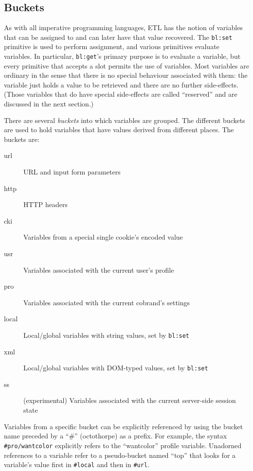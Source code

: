 \documentclass{www2003-submission}
\newcommand{\smtexttt}[1]{{\small\texttt{#1}}}
\begin{document}
\subsection{Buckets}
\label{ssec-buckets}

As with all imperative programming languages, ETL has the notion of
variables that can be assigned to and can later have that value
recovered.  The \smtexttt{bl:set} primitive is used to perform
assignment, and various primitives evaluate variables. In particular,
\smtexttt{bl:get}'s primary purpose is to evaluate a variable, but
every primitive that accepts a slot permits the use of variables.  Most
variables are ordinary in the sense that there is no special behaviour
associated with them: the variable just holds a value to be retrieved and
there are no further side-effects.  (Those variables that do have special
side-effects are called ``reserved'' and are discussed in the next
section.)

There are several \emph{buckets} into which variables are grouped.  The
different buckets are used to hold variables that have values derived
from different places.  The buckets are:

\begin{description}
\item[url] URL and input form parameters
\item[http] HTTP headers
\item[cki] Variables from a special single cookie's encoded value
\item[usr] Variables associated with the current user's profile
\item[pro] Variables associated with the current cobrand's settings
\item[local] Local/global variables with string values, set by \smtexttt{bl:set}
\item[xml] Local/global variables with DOM-typed values, set by \smtexttt{bl:set}
\item[ss] (experimental) Variables associated with the current server-side session
      state
\end{description}

\noindent Variables from a specific bucket can be explicitly referenced
by using the bucket name preceded by a ``\#'' (octothorpe) as a prefix.
For example, the syntax \smtexttt{\#pro/wantcolor} explicitly refers to
the ``wantcolor'' profile variable. Unadorned references to a variable
refer to a pseudo-bucket named ``top'' that looks for a variable's
value first in \smtexttt{\#local} and then in \smtexttt{\#url}.
\end{document}
